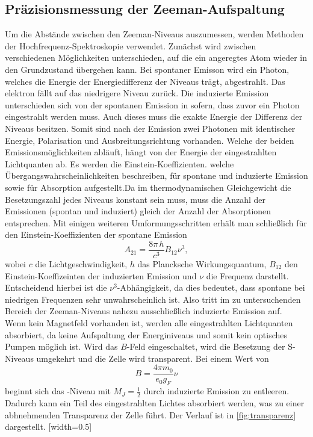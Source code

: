 \subsection{Präzisionsmessung der Zeeman-Aufspaltung}
Um die Abstände zwischen den Zeeman-Niveaus auszumessen, werden Methoden der Hochfrequenz-Spektroskopie verwendet. Zunächst wird zwischen verschiedenen Möglichkeiten unterschieden, auf die ein angeregtes Atom wieder in den Grundzustand übergehen kann. Bei spontaner Emisson wird ein Photon, welches die Energie der Energiedifferenz der Niveaus trägt, abgestrahlt. Das elektron fällt auf das niedrigere Niveau zurück. Die induzierte Emission unterschieden sich von der spontanen Emission in sofern, dass zuvor ein Photon eingestrahlt werden muss. Auch dieses muss die exakte Energie der Differenz der Niveaus besitzen. Somit sind nach der Emission zwei Photonen mit identischer Energie, Polarisation und Ausbreitungsrichtung vorhanden. Welche der beiden Emissionsmöglichkeiten abläuft, hängt von der Energie der eingestrahlten Lichtquanten ab. Es werden die Einstein-Koeffizienten. welche Übergangswahrscheinlichkeiten beschreiben, für spontane und induzierte Emission sowie für Absorption aufgestellt.Da im thermodynamischen Gleichgewicht die Besetzungszahl jedes Niveaus konstant sein muss, muss die Anzahl der Emissionen (spontan und induziert) gleich der Anzahl der Absorptionen entsprechen. Mit einigen weiteren Umformungsschritten erhält man schließlich für den Einstein-Koeffizienten der spontane Emission
\begin{equation}
  A_{21} = \frac{8\pi\,h}{c^3}B_{12}\nu^3,
\end{equation}
wobei $c$ die Lichtgeschwindigkeit, $h$ das Plancksche Wirkungsquantum, $B_{12}$ den Einstein-Koeffizeinten der induzierten Emission und $\nu$ die Frequenz darstellt. Entscheidend hierbei ist die $\nu^3$-Abhängigkeit, da dies bedeutet, dass spontane bei niedrigen Frequenzen sehr unwahrscheinlich ist. Also tritt im zu untersuchenden Bereich der Zeeman-Niveaus nahezu ausschließlich induzierte Emission auf. \\
Wenn kein Magnetfeld vorhanden ist, werden alle eingestrahlten Lichtquanten absorbiert, da keine Aufspaltung der Energiniveaus und somit kein optisches Pumpen möglich ist. Wird das $B$-Feld eingeschaltet, wird die Besetzung der S-Niveaus umgekehrt und die Zelle wird transparent. Bei einem Wert von
\begin{equation}
  \label{eqn:gf}
  B = \frac{4\pi m_0}{e_0 g_F} \nu
\end{equation}
beginnt sich das -Niveau mit $M_J=\frac{1}{2}$ durch induzierte Emission zu entleeren. Dadurch kann ein Teil des eingestrahlten Lichtes absorbiert werden, was zu einer abhnehmenden Transparenz der Zelle führt. Der Verlauf ist in \autoref{fig:transparenz} dargestellt.
[width=0.5\textwidth]

